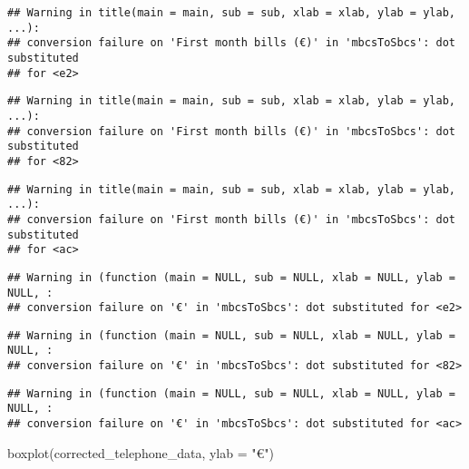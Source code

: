 \documentclass[
]{article}
\newenvironment{Shaded}{\begin{snugshade}}{\end{snugshade}}
\newcommand{\AttributeTok}[1]{\textcolor[rgb]{0.77,0.63,0.00}{#1}}
\newcommand{\FunctionTok}[1]{\textcolor[rgb]{0.00,0.00,0.00}{#1}}
\newcommand{\NormalTok}[1]{#1}
\newcommand{\SpecialCharTok}[1]{\textcolor[rgb]{0.00,0.00,0.00}{#1}}
\newcommand{\StringTok}[1]{\textcolor[rgb]{0.31,0.60,0.02}{#1}}
\begin{document}
\begin{verbatim}
## Warning in title(main = main, sub = sub, xlab = xlab, ylab = ylab, ...):
## conversion failure on 'First month bills (€)' in 'mbcsToSbcs': dot substituted
## for <e2>
\end{verbatim}

\begin{verbatim}
## Warning in title(main = main, sub = sub, xlab = xlab, ylab = ylab, ...):
## conversion failure on 'First month bills (€)' in 'mbcsToSbcs': dot substituted
## for <82>
\end{verbatim}

\begin{verbatim}
## Warning in title(main = main, sub = sub, xlab = xlab, ylab = ylab, ...):
## conversion failure on 'First month bills (€)' in 'mbcsToSbcs': dot substituted
## for <ac>
\end{verbatim}

\begin{Shaded}
\end{Shaded}

\begin{verbatim}
## Warning in (function (main = NULL, sub = NULL, xlab = NULL, ylab = NULL, :
## conversion failure on '€' in 'mbcsToSbcs': dot substituted for <e2>
\end{verbatim}

\begin{verbatim}
## Warning in (function (main = NULL, sub = NULL, xlab = NULL, ylab = NULL, :
## conversion failure on '€' in 'mbcsToSbcs': dot substituted for <82>
\end{verbatim}

\begin{verbatim}
## Warning in (function (main = NULL, sub = NULL, xlab = NULL, ylab = NULL, :
## conversion failure on '€' in 'mbcsToSbcs': dot substituted for <ac>
\end{verbatim}

\begin{Shaded}
\begin{Highlighting}[]
\FunctionTok{boxplot}\NormalTok{(corrected\_telephone\_data, }\AttributeTok{ylab =} \StringTok{"€"}\NormalTok{)}
\end{Highlighting}
\end{Shaded}
\end{document}
